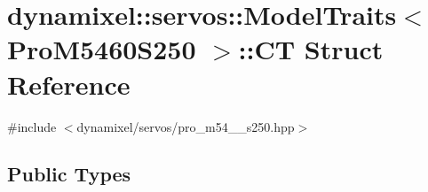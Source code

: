 \hypertarget{structdynamixel_1_1servos_1_1_model_traits_3_01_pro_m5460_s250_01_4_1_1_c_t}{}\section{dynamixel\+:\+:servos\+:\+:Model\+Traits$<$ Pro\+M5460\+S250 $>$\+:\+:C\+T Struct Reference}
\label{structdynamixel_1_1servos_1_1_model_traits_3_01_pro_m5460_s250_01_4_1_1_c_t}


{\ttfamily \#include $<$dynamixel/servos/pro\+\_\+m54\+\_\+\_\+s250.\+hpp$>$}

\subsection*{Public Types}
